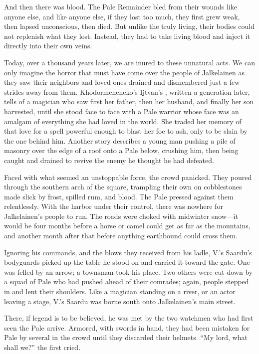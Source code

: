 \documentclass[12pt]{report}
\begin{document}
And then there was blood.  The Pale Remainder bled from their wounds
like anyone else, and like anyone else, if they lost too much, they
first grew weak, then lapsed unconscious, then died.  But unlike the
truly living, their bodies could not replenish what they lost.
Instead, they had to take living blood and inject it directly into
their own veins.

Today, over a thousand years later, we are inured to these unnatural
acts.  We can only imagine the horror that must have come over the
people of Jalkelainen as they saw their neighbors and loved ones
drained and dismembered just a few strides away from them.
Khodormeneneko's Ijtvan's , written a generation
later, tells of a magician who saw first her father, then her husband,
and finally her son harvested, until she stood face to face with a
Pale warrior whose face was an amalgam of everything she had loved in
the world.  She traded her memory of that love for a spell powerful
enough to blast her foe to ash, only to be slain by the one behind
him.  Another story describes a young man pushing a pile of masonry
over the edge of a roof onto a Pale below, crushing him, then being
caught and drained to revive the enemy he thought he had defeated.

Faced with what seemed an unstoppable force, the crowd panicked.  They
poured through the southern arch of the square, trampling their own on
cobblestones made slick by frost, spilled rum, and blood.  The Pale
pressed against them relentlessly.  With the harbor under their
control, there was nowhere for Jalkelainen's people to run.  The roads
were choked with midwinter snow---it would be four months before a
horse or camel could get as far as the mountains, and another month
after that before anything earthbound could cross them.

Ignoring his commands, and the blows they received from his ladle,
V.'s Saardu's bodyguards picked up the table he stood on and carried
it toward the gate.  One was felled by an arrow; a townsman took his
place.  Two others were cut down by a squad of Pale who had pushed
ahead of their comrades; again, people stepped in and lent their
shoulders.  Like a magician standing on a river, or an actor leaving a
stage, V.'s Saardu was borne south onto Jalkelainen's main street.

There, if legend is to be believed, he was met by the two watchmen who
had first seen the Pale arrive.  Armored, with swords in hand, they
had been mistaken for Pale by several in the crowd until they
discarded their helmets.  ``My lord, what shall we?'' the first cried.
\end{document}
